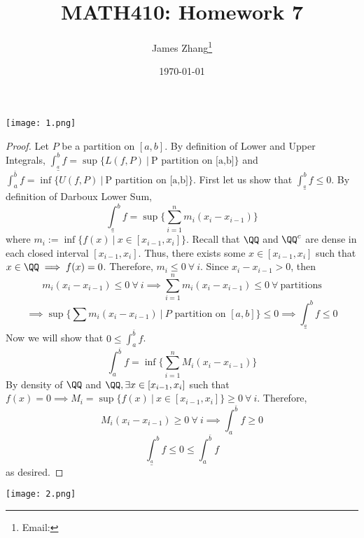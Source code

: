 \documentclass[12pt]{scrartcl}
\newcommand{\lint}{\int_{\overset{a}{\_}}^b}
\newcommand{\uint}{\int_a^{\bar{b}}}
\begin{document}
\title{MATH410: Homework 7}
\author{James Zhang\thanks{Email: }}
\date{\today}



\maketitle

\texttt{[image: 1.png]}

\begin{proof}

\hfill

Let $P$ be a partition on $[a,b]$. By definition of Lower and Upper Integrals, $\lint f = \sup\{L(f, P) \ | \ \text{P partition on [a,b]}\}$
and $\uint f = \inf\{U(f, P) \ | \ \text{P partition on [a,b]}\}$.
First let us show that $\lint f \leq 0$. By definition of Darboux Lower Sum, 
\[\lint f = \sup\{\sum_{i=1}^n m_i (x_i - x_{i-1})\}\]
where $m_i := \inf\{f(x) \ | \ x \in [x_{i-1}, x_i]\}$. Recall that $\QQ$ and $\QQ^c$ are 
dense in each closed interval $[x_{i-1}, x_i]$. Thus, there exists some $x \in [x_{i-1}, x_i]$ such that 
$x \in \QQ \implies f(x) = 0$. Therefore, $m_i \leq 0 \ \forall \ i$. Since $x_i - x_{i-1} > 0$, then 
\[m_i(x_i - x_{i-1}) \leq 0 \ \forall \ i \implies \sum_{i=1}^n m_i(x_i - x_{i-1}) \leq 0 \ \forall \ \text{partitions}\] 
\[\implies \sup\{\sum m_i (x_i - x_{i-1}) \ | \ P \text{ partition on } [a,b]\} \leq 0 \implies \lint f\leq 0\]
Now we will show that $0 \leq \uint f$. 
\[\uint f = \inf\{\sum_{i=1}^n M_i(x_i - x_{i-1})\}\]
By density of $\QQ$ and $\QQ, \exists x \in [x_{i-1}, x_i]$ such that $f(x) = 0 \implies M_i = \sup\{f(x) \ | \ x \in [x_{i-1}, x_i]\}\geq 0 \ \forall \ i$. 
Therefore, 
\[M_i(x_i -x_{i-1}) \geq 0 \ \forall \ i \implies \uint f \geq 0\]
\[\lint f \leq 0 \leq \uint f\]
as desired.

\end{proof}

\newpage

\texttt{[image: 2.png]}
\end{document}
